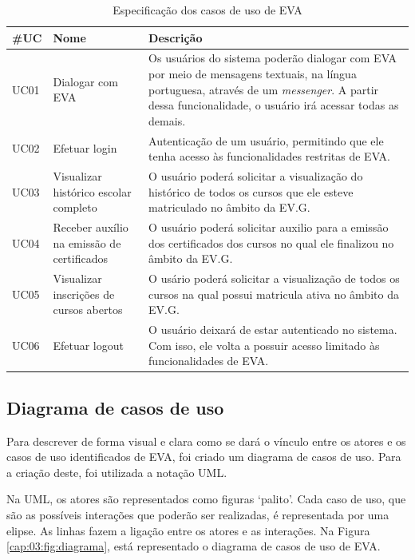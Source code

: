 \begin{table}[htb!]
\caption{Especificação dos casos de uso de EVA}
\label{tabela:tabela4}
\center
\footnotesize
\begin{tabular}{|p{2cm}|p{3cm}|p{7.5cm}|}
  \hline
   \textbf{\#UC} & \textbf{Nome}  & \textbf{Descrição}  \\
   \hline
    UC01 & Dialogar com EVA & Os usuários do sistema poderão dialogar com EVA por meio de mensagens textuais, na língua portuguesa, através de um \textit{messenger}. A partir dessa funcionalidade, o usuário irá acessar todas as demais.\\
   \hline
    UC02 & Efetuar login & Autenticação de um usuário, permitindo que ele tenha acesso às funcionalidades restritas de EVA. \\
   \hline
    UC03 & Visualizar histórico escolar completo & O usuário poderá solicitar a visualização do histórico de todos os cursos que ele esteve matriculado no âmbito da EV.G. \\
   \hline
    UC04 & Receber auxílio na emissão de certificados & O usuário poderá solicitar auxilio para a emissão dos certificados dos cursos no qual ele finalizou no âmbito da EV.G. \\
   \hline
    UC05 & Visualizar inscrições de cursos abertos & O usário poderá solicitar a visualização de todos os cursos na qual possui matricula ativa no âmbito da EV.G. \\
   \hline
    UC06 & Efetuar logout & O usuário deixará de estar autenticado no sistema. Com isso, ele volta a possuir acesso limitado às funcionalidades de EVA.\\
   \hline
\end{tabular}
\end{table}\label{tabela:3}

\subsection{Diagrama de casos de uso}

Para descrever de forma visual e clara como se dará o vínculo entre os atores e os casos de uso identificados de EVA, foi criado um diagrama de casos de uso. Para a criação deste, foi utilizada a notação UML.

Na UML, os atores são representados como figuras ‘palito’. Cada caso de uso, que são as possíveis interações que poderão ser realizadas, é representada por uma elipse. As linhas fazem a ligação entre os atores e as interações. Na Figura \ref{cap:03:fig:diagrama}, está representado o diagrama de casos de uso de EVA.

